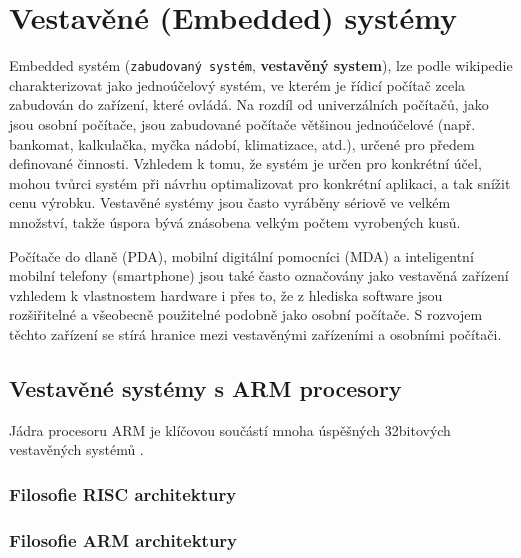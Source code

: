 \chapter{Vestavěné (Embedded) systémy}
\minitoc
Embedded systém (\texttt{zabudovaný systém}, \textbf{vestavěný system}), lze podle wikipedie 
charakterizovat jako jednoúčelový systém, ve kterém je řídicí počítač zcela zabudován do zařízení, 
které ovládá. Na rozdíl od univerzálních počítačů, jako jsou osobní počítače, jsou zabudované 
počítače většinou jednoúčelové (např. bankomat, kalkulačka, myčka nádobí, klimatizace, atd.), 
určené pro předem definované činnosti. Vzhledem k tomu, že systém je určen pro konkrétní účel, 
mohou tvůrci systém při návrhu optimalizovat pro konkrétní aplikaci, a tak snížit cenu výrobku. 
Vestavěné systémy jsou často vyráběny sériově ve velkém množství, takže úspora bývá znásobena 
velkým počtem vyrobených kusů.

Počítače do dlaně (PDA), mobilní digitální pomocníci (MDA) a inteligentní mobilní telefony 
(smartphone) jsou také často označovány jako vestavěná zařízení vzhledem k vlastnostem hardware i 
přes to, že z hlediska software jsou rozšiřitelné a všeobecně použitelné podobně jako osobní 
počítače. S rozvojem těchto zařízení se stírá hranice mezi vestavěnými zařízeními a osobními 
počítači.

\section{Vestavěné systémy s ARM procesory}
  Jádra procesoru ARM je klíčovou součástí mnoha úspěšných 32bitových vestavěných systémů 
  \cite[s.~3]{sloss2004arm}.
  
  \subsection{Filosofie RISC architektury}
  
  \subsection{Filosofie ARM architektury}
